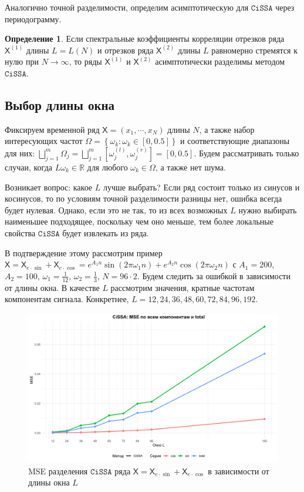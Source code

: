 \documentclass[12pt, specialist, subf
]{disser}
\theoremstyle{definition}
\newcommand{\CISSA}{\texttt{CiSSA}}
\newcommand{\TS}{\mathsf{X}}
\newtheorem{definition}{Определение} %
\begin{document}
Аналогично точной разделимости, определим асимптотическую для $\CISSA$ через периодограмму.

\begin{definition}
	\label{def:asymp_cissa}
	Если спектральные коэффициенты корреляции отрезков ряда \( \TS^{(1)} \) длины \( L = L(N) \) и отрезков ряда \( \TS^{(2)} \) длины \( L \) равномерно стремятся к нулю при \( N \to \infty \), то ряды \( \TS^{(1)} \) и \( \TS^{(2)} \) асимптотически разделимы методом $\CISSA$.
\end{definition}


\subsection{Выбор длины окна}

Фиксируем временной ряд $\TS = \left(x_1, \cdots, x_N\right)$ длины $N$, а также набор интересующих частот $\Omega = \left\{\omega_k: \omega_k \in [0, 0.5] \right\}$ и соответствующие диапазоны для них:
		      $\bigsqcup \limits_{j=1}^m \Omega_j =
			      \bigsqcup \limits_{j=1}^m
			      \left[ \omega_j^{(l)}, \omega_j^{(r)} \right] =
			      [0, 0.5]$.
Будем рассматривать только случаи, когда $L \omega_k \in \mathbb{R}$ для любого $\omega_k \in \Omega$, а также нет шума.

Возникает вопрос: какое $L$ лучше выбрать? Если ряд состоит только из синусов и косинусов, то по условиям точной разделимости разницы нет, ошибка всегда будет нулевая. Однако, если это не так, то из всех возможных $L$ нужно выбирать наименьшее подходящее, поскольку чем оно меньше, тем более локальные свойства $\CISSA$ будет извлекать из ряда.

В подтверждение этому рассмотрим пример $\TS = \TS_{e\cdot\sin} + \TS_{e\cdot\cos} = e^{A_1 n } \sin(2\pi \omega_1 n ) + e^{A_2 n} \cos(2\pi \omega_2 n )$ с $A_1 = 200$, $A_2 = 100$, $\omega_1 = \frac{1}{12}$, $\omega_2 = \frac{1}{3}$, $N = 96 \cdot 2$. Будем следить за ошибкой в зависимости от длины окна. В качестве $L$ рассмотрим значения, кратные частотам компонентам сигнала. Конкретнее,  $L = 12, 24, 36, 48, 60, 72, 84, 96, 192$.

\begin{figure}[H]
	\centering
	\includegraphics[width=1\textwidth]{img/cissa_errors_plot.png}
	\caption{MSE разделения $\CISSA$ ряда $\TS = \TS_{e\cdot\sin} + \TS_{e\cdot\cos}$ в зависимости от длины окна $L$}
	\label{fig:cissa_error_depends_on_L}
\end{figure}
\end{document}

